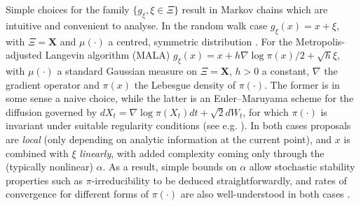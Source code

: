 \documentclass[bj,numbers,noshowframe]{imsart}
\newcommand{\X}{\mathbf{X}}
\theoremstyle{definition}
\theoremstyle{plain}
\theoremstyle{definition}
\begin{document}
Simple choices for the family $\{g_\xi, \xi \in \Xi\}$ result in Markov chains which are intuitive and convenient to analyse.  In the random walk case $g_\xi(x) = x + \xi$, with $\Xi = \X$ and $\mu(\cdot)$ a centred, symmetric distribution \citep{tierney1994markov}.  For the Metropolis-adjusted Langevin algorithm (MALA) $g_\xi(x) = x + h\nabla\log\pi(x)/2 + \sqrt{h}\xi$, with $\mu(\cdot)$ a standard Gaussian measure on $\Xi = \X$, $h>0$ a constant, $\nabla$ the gradient operator and $\pi(x)$ the Lebesgue density of $\pi(\cdot)$.  The former is in some sense a naive choice, while the latter is an Euler--Maruyama scheme for the diffusion governed by $dX_t = \nabla\log\pi(X_t)dt + \sqrt{2}dW_t$, for which $\pi(\cdot)$ is invariant under suitable regularity conditions (see e.g. \citep{roberts1996exponential}).  In both cases proposals are \emph{local} (only depending on analytic information at the current point), and $x$ is combined with $\xi$ \emph{linearly}, with added complexity coming only through the (typically nonlinear) $\alpha$.  As a result, simple bounds on $\alpha$ allow stochastic stability properties such as $\pi$-irreducibility to be deduced straightforwardly, and rates of convergence for different forms of $\pi(\cdot)$ are also well-understood in both cases \citep{roberts1996geometric,roberts1996exponential}.
\end{document}
